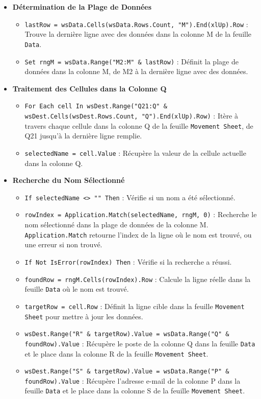 \documentclass[a4paper, oneside, 12pt, final]{extreport}
\begin{document}
\begin{itemize}
    \item \textbf{Détermination de la Plage de Données}
    \begin{itemize}
        \item \texttt{lastRow = wsData.Cells(wsData.Rows.Count, "M").End(xlUp).Row} : Trouve la dernière ligne avec des données dans la colonne M de la feuille \texttt{Data}.
        \item \texttt{Set rngM = wsData.Range("M2:M" \& lastRow)} : Définit la plage de données dans la colonne M, de M2 à la dernière ligne avec des données.
    \end{itemize}

    \item \textbf{Traitement des Cellules dans la Colonne Q} 
    \begin{itemize}
        \item \texttt{For Each cell In wsDest.Range("Q21:Q" \& wsDest.Cells(wsDest.Rows.Count, "Q").End(xlUp).Row)} : Itère à travers chaque cellule dans la colonne Q de la feuille \texttt{Movement Sheet}, de Q21 jusqu'à la dernière ligne remplie.
        \item \texttt{selectedName = cell.Value} : Récupère la valeur de la cellule actuelle dans la colonne Q.
    \end{itemize}

    \item \textbf{Recherche du Nom Sélectionné}
    \begin{itemize}
        \item \texttt{If selectedName <> "" Then} : Vérifie si un nom a été sélectionné.
        \item \texttt{rowIndex = Application.Match(selectedName, rngM, 0)} : Recherche le nom sélectionné dans la plage de données de la colonne M. \texttt{Application.Match} retourne l'index de la ligne où le nom est trouvé, ou une erreur si non trouvé.
        \item \texttt{If Not IsError(rowIndex) Then} : Vérifie si la recherche a réussi.
        \item \texttt{foundRow = rngM.Cells(rowIndex).Row} : Calcule la ligne réelle dans la feuille \texttt{Data} où le nom est trouvé.
        \item \texttt{targetRow = cell.Row} : Définit la ligne cible dans la feuille \texttt{Movement Sheet} pour mettre à jour les données.
        \item \texttt{wsDest.Range("R" \& targetRow).Value = wsData.Range("Q" \& foundRow).Value} : Récupère le poste de la colonne Q dans la feuille \texttt{Data} et le place dans la colonne R de la feuille \texttt{Movement Sheet}.
        \item \texttt{wsDest.Range("S" \& targetRow).Value = wsData.Range("P" \& foundRow).Value} : Récupère l'adresse e-mail de la colonne P dans la feuille \texttt{Data} et le place dans la colonne S de la feuille \texttt{Movement Sheet}.
    \end{itemize}


\end{itemize}
\end{document}

